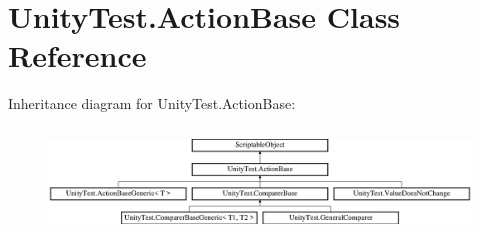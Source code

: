 \hypertarget{class_unity_test_1_1_action_base}{}\section{Unity\+Test.\+Action\+Base Class Reference}
\label{class_unity_test_1_1_action_base}
Inheritance diagram for Unity\+Test.\+Action\+Base\+:\begin{figure}[H]
\begin{center}
\leavevmode
\includegraphics[height=2.817610cm]{class_unity_test_1_1_action_base}
\end{center}
\end{figure}
